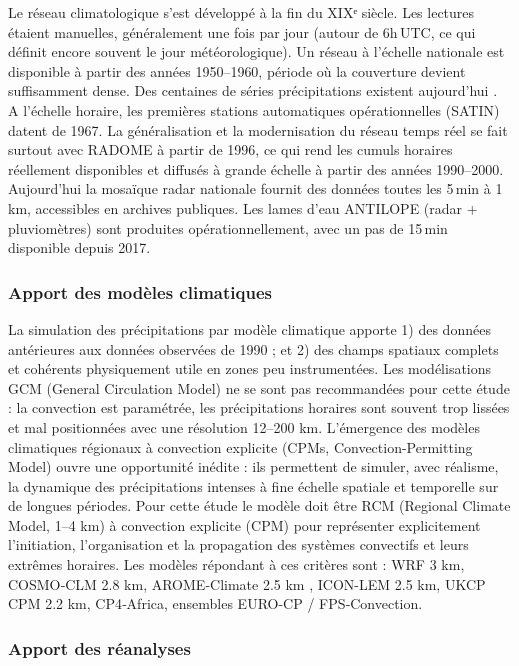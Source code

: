 \documentclass[
  article,
  nofooter,
  noheadings]{jss}
\begin{document}
Le réseau climatologique s'est développé à la fin du XIXᵉ siècle. Les
lectures étaient manuelles, généralement une fois par jour (autour de
6h\,UTC, ce qui définit encore souvent le jour météorologique). Un
réseau à l'échelle nationale est disponible à partir des années
1950--1960, période où la couverture devient suffisamment dense. Des
centaines de séries précipitations existent aujourd'hui
\citep{meteo-france_2020_breve_observation_classique}. A l'échelle
horaire, les premières stations automatiques opérationnelles (SATIN)
datent de 1967. La généralisation et la modernisation du réseau temps
réel se fait surtout avec RADOME à partir de 1996, ce qui rend les
cumuls horaires réellement disponibles et diffusés à grande échelle à
partir des années 1990--2000. Aujourd'hui la mosaïque radar nationale
fournit des données toutes les 5\,min à 1\,km, accessibles en archives
publiques. Les lames d'eau ANTILOPE (radar + pluviomètres) sont
produites opérationnellement, avec un pas de 15\,min disponible depuis
2017.

\subsubsection{Apport des modèles
climatiques}\label{apport-des-moduxe8les-climatiques}

La simulation des précipitations par modèle climatique apporte 1) des
données antérieures aux données observées de 1990 ; et 2) des champs
spatiaux complets et cohérents physiquement utile en zones peu
instrumentées. Les modélisations GCM (General Circulation Model) ne se
sont pas recommandées pour cette étude : la convection est paramétrée,
les précipitations horaires sont souvent trop lissées et mal
positionnées avec une résolution 12--200 km. L'émergence des modèles
climatiques régionaux à convection explicite (CPMs,
Convection-Permitting Model) ouvre une opportunité inédite : ils
permettent de simuler, avec réalisme, la dynamique des précipitations
intenses à fine échelle spatiale et temporelle sur de longues périodes.
Pour cette étude le modèle doit être RCM (Regional Climate Model, 1--4
km) à convection explicite (CPM) pour représenter explicitement
l'initiation, l'organisation et la propagation des systèmes convectifs
et leurs extrêmes horaires. Les modèles répondant à ces critères sont :
WRF 3 km, COSMO‑CLM 2.8 km, AROME‑Climate 2.5 km \citep{cnrm_arome2007},
ICON-LEM 2.5 km, UKCP CPM 2.2 km, CP4‑Africa, ensembles EURO-CP /
FPS‑Convection.

\subsubsection{Apport des réanalyses}\label{apport-des-ruxe9analyses}
\end{document}
